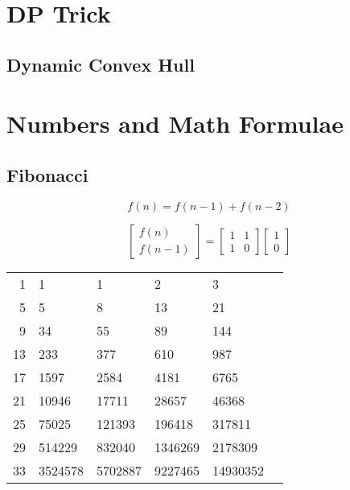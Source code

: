 \documentclass[twocolumn]{article}
\begin{document}
\section{DP Trick}

\subsection{Dynamic Convex Hull}


\section{Numbers and Math Formulae}

\subsection{Fibonacci}

$$f(n)=f(n-1)+f(n-2)$$

\begin{equation*}
    \begin{bmatrix}
        f(n) \\
        f(n - 1)
    \end{bmatrix}
    =
    \begin{bmatrix}
        1 & 1 \\
        1 & 0
    \end{bmatrix}
    \begin{bmatrix}
        1 \\
        0
    \end{bmatrix}
\end{equation*}

\begin{center}
    \begin{tabular}{r|lllll}
        1 & 1 & 1 & 2 & 3 \\
        5 & 5 & 8 & 13 & 21 \\
        9 & 34 & 55 & 89 & 144 \\
        13 & 233 & 377 & 610 & 987 \\
        17 & 1597 & 2584 & 4181 & 6765 \\
        21 & 10946 & 17711 & 28657 & 46368 \\
        25 & 75025 & 121393 & 196418 & 317811 \\
        29 & 514229 & 832040 & 1346269 & 2178309 \\
        33 & 3524578 & 5702887 & 9227465 & 14930352
    \end{tabular}
\end{center}
\end{document}
